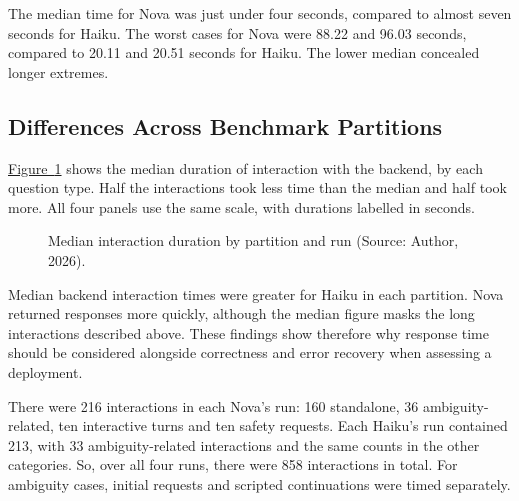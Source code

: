 \begin{table}[H]
\centering
{\footnotesize
\setlength{\tabcolsep}{3pt}
\renewcommand{\arraystretch}{1.2}

}
\caption{Recorded tokens and backend interaction durations (Source: Author, 2026).}
\label{tab:resource-usage}
\end{table}

The median time for Nova was just under four seconds, compared to almost seven seconds for Haiku.
The worst cases for Nova were 88.22 and 96.03 seconds, compared to 20.11 and 20.51 seconds for Haiku.
The lower median concealed longer extremes.

\clearpage
\subsection{Differences Across Benchmark Partitions}

\hyperref[fig:resource-timings]{Figure~\ref*{fig:resource-timings}} 
shows the median duration of interaction with the backend, 
by each question type.
Half the interactions took less time than the median and half took more.
All four panels use the same scale, with durations labelled in seconds.

\begin{figure}[H]
\centering

\caption{Median interaction duration by partition and run (Source: Author, 2026).}
\label{fig:resource-timings}
\end{figure}

Median backend interaction times were greater for Haiku in each partition. 
Nova returned responses more quickly, although the median figure 
masks the long interactions described above.
These findings show therefore why response time should be
considered alongside correctness and error recovery when assessing a deployment.

There were 216 interactions in each Nova's run: 160 standalone, 
36 ambiguity-related, ten interactive turns and ten safety requests. 
Each Haiku's run contained 213, with 33 ambiguity-related interactions 
and the same counts in the other categories.
So, over all four runs, there were 858 interactions in total.
For ambiguity cases, initial requests and scripted continuations were timed
separately.